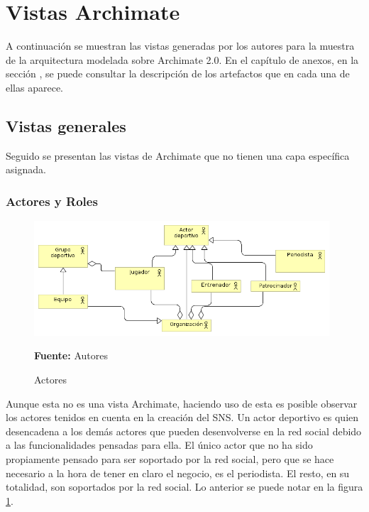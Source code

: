\section{Vistas Archimate}

A continuación se muestran las vistas generadas por los autores para la muestra de la arquitectura modelada sobre Archimate 2.0. En el capítulo de anexos, en la sección \cite{anexos_tesis}, se puede consultar la descripción de los artefactos que en cada una de ellas aparece.

\subsection{Vistas generales}

Seguido se presentan las vistas de Archimate que no tienen una capa específica asignada.

\subsubsection{Actores y Roles}

\begin{figure}[!htb]
  \begin{center}
    \includegraphics[width=11cm]{./imagenes/Archimate/vistas/generales/actores.png}
    \caption{Actores}
    \label{fig:Actores}
    \textbf{Fuente:}  Autores \\
  \end{center}
\end{figure}

Aunque esta no es una vista Archimate, haciendo uso de esta es posible observar los actores tenidos en cuenta en la creación del SNS. Un actor deportivo es quien desencadena a los demás actores que pueden desenvolverse en la red social debido a las funcionalidades pensadas para ella. El único actor que no ha sido propiamente pensado para ser soportado por la red social, pero que se hace necesario a la hora de tener en claro el negocio, es el periodista. El resto, en su totalidad, son soportados por la red social. Lo anterior se puede notar en la figura \ref{fig:Actores}.

